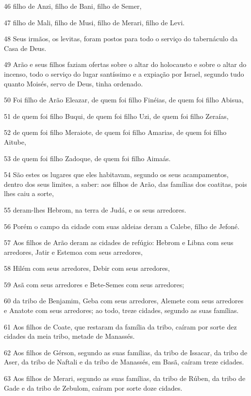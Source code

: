 \par 46 filho de Anzi, filho de Bani, filho de Semer,
\par 47 filho de Mali, filho de Musi, filho de Merari, filho de Levi.
\par 48 Seus irmãos, os levitas, foram postos para todo o serviço do tabernáculo da Casa de Deus.
\par 49 Arão e seus filhos faziam ofertas sobre o altar do holocausto e sobre o altar do incenso, todo o serviço do lugar santíssimo e a expiação por Israel, segundo tudo quanto Moisés, servo de Deus, tinha ordenado.
\par 50 Foi filho de Arão Eleazar, de quem foi filho Finéias, de quem foi filho Abisua,
\par 51 de quem foi filho Buqui, de quem foi filho Uzi, de quem foi filho Zeraías,
\par 52 de quem foi filho Meraiote, de quem foi filho Amarias, de quem foi filho Aitube,
\par 53 de quem foi filho Zadoque, de quem foi filho Aimaás.
\par 54 São estes os lugares que eles habitavam, segundo os seus acampamentos, dentro dos seus limites, a saber: aos filhos de Arão, das famílias dos coatitas, pois lhes caiu a sorte,
\par 55 deram-lhes Hebrom, na terra de Judá, e os seus arredores.
\par 56 Porém o campo da cidade com suas aldeias deram a Calebe, filho de Jefoné.
\par 57 Aos filhos de Arão deram as cidades de refúgio: Hebrom e Libna com seus arredores, Jatir e Estemoa com seus arredores,
\par 58 Hilém com seus arredores, Debir com seus arredores,
\par 59 Asã com seus arredores e Bete-Semes com seus arredores;
\par 60 da tribo de Benjamim, Geba com seus arredores, Alemete com seus arredores e Anatote com seus arredores; ao todo, treze cidades, segundo as suas famílias.
\par 61 Aos filhos de Coate, que restaram da família da tribo, caíram por sorte dez cidades da meia tribo, metade de Manassés.
\par 62 Aos filhos de Gérson, segundo as suas famílias, da tribo de Issacar, da tribo de Aser, da tribo de Naftali e da tribo de Manassés, em Basã, caíram treze cidades.
\par 63 Aos filhos de Merari, segundo as suas famílias, da tribo de Rúben, da tribo de Gade e da tribo de Zebulom, caíram por sorte doze cidades.

